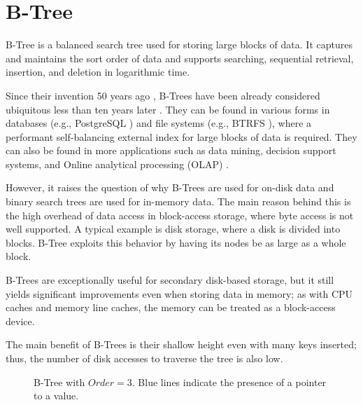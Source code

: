 \section{B-Tree}\label{section:b-tree}

B-Tree is a balanced search tree used for storing large blocks of data. It captures and maintains the sort order of data and supports searching, sequential retrieval, insertion, and deletion in logarithmic time.

Since their invention 50 years ago \cite{bayer-org}, B-Trees have been already considered ubiquitous less than ten years later \cite{10.1145/356770.356776}. They can be found in various forms in databases (e.g., PostgreSQL \cite{postgresql}) and file systems (e.g., BTRFS \cite{btrfs}), where a performant self-balancing external index for large blocks of data is required. They can also be found in more applications such as data mining, decision support systems, and Online analytical processing (OLAP) \cite{olap,goetz-tech}.

However, it raises the question of why B-Trees are used for on-disk data and binary search trees are used for in-memory data. The main reason behind this is the high overhead of data access in block-access storage, where byte access is not well supported. A typical example is disk storage, where a disk is divided into blocks. B-Tree exploits this behavior by having its nodes be as large as a whole block.

B-Trees are exceptionally useful for secondary disk-based storage, but it still yields significant improvements even when storing data in memory; as with CPU caches and memory line caches, the memory can be treated as a block-access device.

The main benefit of B-Trees is their shallow height even with many keys inserted; thus, the number of disk accesses to traverse the tree is also low.

\begin{figure}[H]
  \centering
  
  \caption[B-Tree with $\mathit{Order} = 3$.]{B-Tree with $\mathit{Order} = 3$. Blue lines indicate the presence of a pointer to a value.}
  \label{figure:b-tree}
\end{figure}

